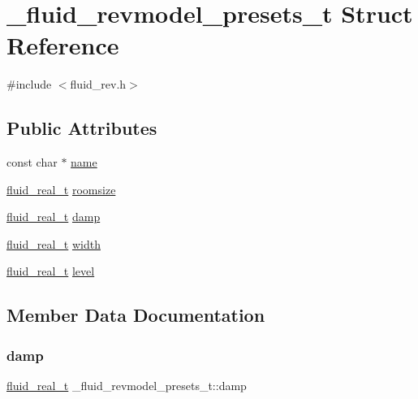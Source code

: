 \hypertarget{struct__fluid__revmodel__presets__t}{}\section{\+\_\+fluid\+\_\+revmodel\+\_\+presets\+\_\+t Struct Reference}
\label{struct__fluid__revmodel__presets__t}


{\ttfamily \#include $<$fluid\+\_\+rev.\+h$>$}

\subsection*{Public Attributes}
\begin{DoxyCompactItemize}
\item 
const char $\ast$ \hyperlink{struct__fluid__revmodel__presets__t_abf75cb0b9655566e56ef772dd94f1550}{name}
\item 
\hyperlink{fluidsynth__priv_8h_a9e96f0917747b69cabb7c671bc693dbb}{fluid\+\_\+real\+\_\+t} \hyperlink{struct__fluid__revmodel__presets__t_ae7c8892d7f2d3fa23a91d0d769ccf138}{roomsize}
\item 
\hyperlink{fluidsynth__priv_8h_a9e96f0917747b69cabb7c671bc693dbb}{fluid\+\_\+real\+\_\+t} \hyperlink{struct__fluid__revmodel__presets__t_a4259eaa746ac4a2df30346778594bcde}{damp}
\item 
\hyperlink{fluidsynth__priv_8h_a9e96f0917747b69cabb7c671bc693dbb}{fluid\+\_\+real\+\_\+t} \hyperlink{struct__fluid__revmodel__presets__t_a7910778be5004ed5c71ee974181bfa3b}{width}
\item 
\hyperlink{fluidsynth__priv_8h_a9e96f0917747b69cabb7c671bc693dbb}{fluid\+\_\+real\+\_\+t} \hyperlink{struct__fluid__revmodel__presets__t_a7759d0ab16db5cc515e885372a47787c}{level}
\end{DoxyCompactItemize}


\subsection{Member Data Documentation}
\mbox{\label{struct__fluid__revmodel__presets__t_a4259eaa746ac4a2df30346778594bcde}} 
\subsubsection{\texorpdfstring{damp}{damp}}
{\footnotesize\ttfamily \hyperlink{fluidsynth__priv_8h_a9e96f0917747b69cabb7c671bc693dbb}{fluid\+\_\+real\+\_\+t} \+\_\+fluid\+\_\+revmodel\+\_\+presets\+\_\+t\+::damp}

